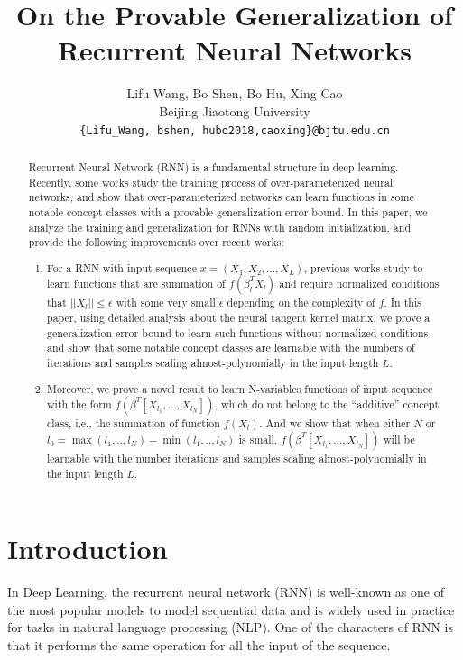 \documentclass{article}
\begin{document}
\title{On the Provable Generalization of Recurrent Neural Networks}

\author{Lifu Wang, Bo Shen, Bo Hu, Xing Cao\\
	Beijing Jiaotong University\\
	\texttt{\{Lifu\_Wang, bshen, hubo2018,caoxing\}@bjtu.edu.cn}
}


\date{}
\maketitle
\begin{abstract}
Recurrent Neural Network (RNN) is a fundamental structure in deep learning. Recently, some works study the training process of over-parameterized neural networks, and show that over-parameterized networks can learn functions in some notable concept classes with a provable generalization error bound. In this paper, we analyze the training and generalization for RNNs with random initialization, and provide the following improvements over recent works:
\begin{enumerate}[(1)]
\item For a RNN with input sequence $x=(X_1,X_2,...,X_L)$, previous works study to learn functions that are summation of $f(\beta^T_lX_l)$ and require normalized conditions that $||X_l||\leq\epsilon$ with some very small $\epsilon$ depending on the complexity of $f$. In this paper, using detailed analysis about the neural tangent kernel matrix, we prove a generalization error bound to learn such functions without normalized conditions and show that some notable concept classes are learnable with  the numbers of iterations and samples scaling almost-polynomially in the input length $L$.
\item  Moreover, we prove a novel result to learn N-variables functions of input sequence  with the form $f(\beta^T[X_{l_1},...,X_{l_N}])$, which do not belong to the ``additive'' concept class, i,e., the summation of function $f(X_l)$. And we show that when either $N$ or $l_0=\max(l_1,..,l_N)-\min(l_1,..,l_N)$ is small, $f(\beta^T[X_{l_1},...,X_{l_N}])$ will be learnable with the number iterations and samples scaling  almost-polynomially in the input length $L$.

\end{enumerate}
\end{abstract}
\section{Introduction}
In Deep Learning, the recurrent neural network (RNN) is well-known as one of the most popular models to model sequential data and is widely used in practice for tasks in natural language processing (NLP). One of the characters of RNN is that it performs the same operation for all the input of the sequence.
\end{document}
